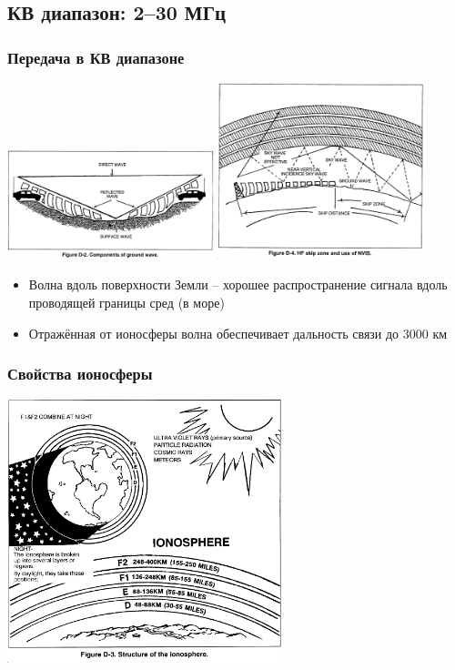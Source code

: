 \documentclass[utf8]{beamer}
\begin{document}
\subsection{КВ диапазон: 2--30 МГц}
\begin{frame}
\frametitle{Передача в КВ диапазоне}
\begin{center}
\includegraphics[width=0.45\textwidth]{pics/gnd-wave.png}
\includegraphics[width=0.45\textwidth]{pics/reflected-wave.png}
\end{center}
\begin{itemize}
 \item Волна вдоль поверхности Земли -- хорошее распространение сигнала вдоль проводящей границы сред (в море)
 \item Отражённая от ионосферы волна обеспечивает дальность связи до 3000 км
\end{itemize}
\end{frame}
\begin{frame}
\frametitle{Свойства ионосферы}
\begin{center}
\includegraphics[width=0.6\textwidth]{pics/ionosphere.png}
\end{center}
\end{frame}
\end{document}
